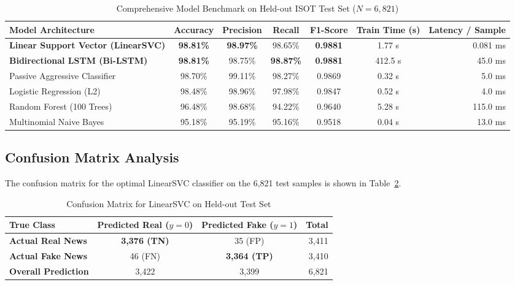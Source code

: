 \documentclass[11pt,a4paper]{article}
\begin{document}
\begin{table}[t]
\centering
\caption{Comprehensive Model Benchmark on Held-out ISOT Test Set ($N=6,821$)}
\label{tab:benchmarks}
\vspace{0.2cm}
\begin{tabularx}{\textwidth}{lcccccr}
\toprule
\textbf{Model Architecture} & \textbf{Accuracy} & \textbf{Precision} & \textbf{Recall} & \textbf{F1-Score} & \textbf{Train Time (s)} & \textbf{Latency / Sample} \\
\midrule
\textbf{Linear Support Vector (LinearSVC)} & \textbf{98.81\%} & \textbf{98.97\%} & 98.65\% & \textbf{0.9881} & 1.77 s & 0.081 ms \\
\textbf{Bidirectional LSTM (Bi-LSTM)}      & \textbf{98.81\%} & 98.75\% & \textbf{98.87\%} & \textbf{0.9881} & 412.5 s & 45.0 ms \\
Passive Aggressive Classifier              & 98.70\% & 99.11\% & 98.27\% & 0.9869 & 0.32 s & 5.0 ms \\
Logistic Regression (L2)                   & 98.48\% & 98.96\% & 97.98\% & 0.9847 & 0.52 s & 4.0 ms \\
Random Forest (100 Trees)                  & 96.48\% & 98.68\% & 94.22\% & 0.9640 & 5.28 s & 115.0 ms \\
Multinomial Naive Bayes                    & 95.18\% & 95.19\% & 95.16\% & 0.9518 & 0.04 s & 13.0 ms \\
\bottomrule
\end{tabularx}
\end{table}

\subsection{Confusion Matrix Analysis}
The confusion matrix for the optimal LinearSVC classifier on the 6,821 test samples is shown in Table~\ref{tab:confusion_matrix}.

\begin{table}[H]
\centering
\caption{Confusion Matrix for LinearSVC on Held-out Test Set}
\label{tab:confusion_matrix}
\vspace{0.2cm}
\small
\begin{tabularx}{\columnwidth}{Xccr}
\toprule
\textbf{True Class} & \textbf{Predicted Real ($y=0$)} & \textbf{Predicted Fake ($y=1$)} & \textbf{Total} \\
\midrule
\textbf{Actual Real News} & \textbf{3,376 (TN)} & 35 (FP) & 3,411 \\
\textbf{Actual Fake News} & 46 (FN) & \textbf{3,364 (TP)} & 3,410 \\
\midrule
\textbf{Overall Prediction} & 3,422 & 3,399 & 6,821 \\
\bottomrule
\end{tabularx}
\end{table}
\end{document}
